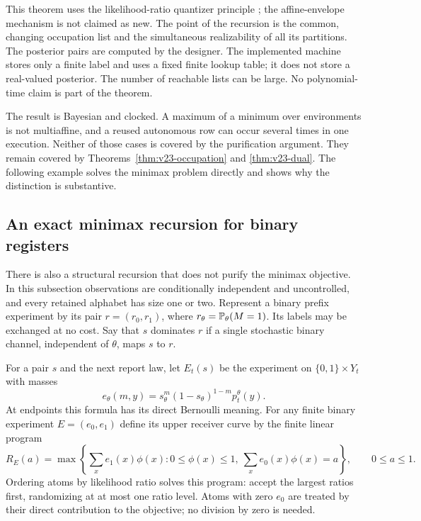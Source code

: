 This theorem uses the likelihood-ratio quantizer principle
\cite{Tsitsiklis1993}; the affine-envelope mechanism is not claimed as
new. The point of the recursion is the common, changing occupation
list and the simultaneous realizability of all its partitions. The
posterior pairs are computed by the designer. The implemented machine
stores only a finite label and uses a fixed finite lookup table; it
does not store a real-valued posterior. The number of reachable lists
can be large. No polynomial-time claim is part of the theorem.

The result is Bayesian and clocked. A maximum of a minimum over
environments is not multiaffine, and a reused autonomous row can occur
several times in one execution. Neither of those cases is covered by
the purification argument. They remain covered by
Theorems~\ref{thm:v23-occupation} and \ref{thm:v23-dual}. The following
example solves the minimax problem directly and shows why the distinction
is substantive.

\subsection{An exact minimax recursion for binary registers}
There is also a structural recursion that does not purify the minimax
objective. In this subsection observations are conditionally independent
and uncontrolled, and every retained alphabet has size one or two.
Represent a binary prefix experiment by its pair
$r=(r_0,r_1)$, where $r_\theta=\mathbb P_\theta(M=1)$. Its labels may be
exchanged at no cost. Say that $s$ dominates $r$ if a single stochastic
binary channel, independent of $\theta$, maps $s$ to $r$.

For a pair $s$ and the next report law, let $E_t(s)$ be the experiment
on $\{0,1\}\times Y_t$ with masses
\[
 e_\theta(m,y)=s_\theta^m(1-s_\theta)^{1-m}p_t^\theta(y).
\]
At endpoints this formula has its direct Bernoulli meaning. For any
finite binary experiment $E=(e_0,e_1)$ define its upper receiver curve
by the finite linear program
\begin{equation}\label{eq:v23-roc}
 R_E(a)=\max\left\{\sum_x e_1(x)\phi(x):
       0\le\phi(x)\le1,\ \sum_xe_0(x)\phi(x)=a\right\},
                           \qquad 0\le a\le1.
\end{equation}
Ordering atoms by likelihood ratio solves this program: accept the
largest ratios first, randomizing at at most one ratio level. Atoms
with zero $e_0$ are treated by their direct contribution to the objective;
no division by zero is needed.

